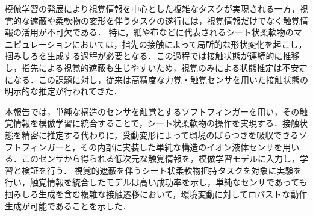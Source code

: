 模倣学習の発展により視覚情報を中心とした複雑なタスクが実現される一方\cite{zhaoLearningFineGrainedBimanual2023}，視覚的な遮蔽や柔軟物の変形を伴うタスクの遂行には，視覚情報だけでなく触覚情報の活用が不可欠である．
特に，紙や布などに代表されるシート状柔軟物のマニピュレーションにおいては，指先の接触によって局所的な形状変化を起こし，掴みしろを生成する過程が必要となる．この過程では接触状態が連続的に推移し，指先による視覚的遮蔽も生じやすいため，視覚のみによる状態推定は不安定になる\cite{zhuDeformableFragileObject2025,kadiDataDrivenRoboticManipulation2023}．この課題に対し，従来は高精度な力覚・触覚センサを用いた接触状態の明示的な推定が行われてきた\cite{example}．\par
本報告では，単純な構造のセンサを触覚とするソフトフィンガーを用い，その触覚情報を模倣学習に統合することで，シート状柔軟物の操作を実現する．接触状態を精密に推定する代わりに，受動変形によって環境のばらつきを吸収できるソフトフィンガーと，その内部に実装した単純な構造のイオン液体センサを用いる．このセンサから得られる低次元な触覚情報を，模倣学習モデルに入力し，学習と検証を行う．
視覚的遮蔽を伴うシート状柔軟物把持タスクを対象に実験を行い，触覚情報を統合したモデルは高い成功率を示し，単純なセンサであっても掴みしろ生成を含む複雑な接触遷移において，環境変動に対してロバストな動作生成が可能であることを示した．\par